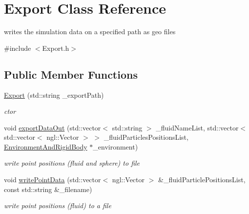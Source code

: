 \hypertarget{class_export}{
\section{Export Class Reference}
\label{class_export}
}


writes the simulation data on a specified path as geo files  




{\ttfamily \#include $<$Export.h$>$}

\subsection*{Public Member Functions}
\begin{DoxyCompactItemize}
\item 
\hyperlink{class_export_a4d7d6897c99839d1bc1571c51018bec8}{Export} (std::string \_\-exportPath)
\begin{DoxyCompactList}\small\item\em ctor \item\end{DoxyCompactList}\item 
void \hyperlink{class_export_ae3981dfddf020b1da5b91e344247977b}{exportDataOut} (std::vector$<$ std::string $>$ \_\-fluidNameList, std::vector$<$ std::vector$<$ ngl::Vector $>$ $>$ \_\-fluidParticlesPositionsList, \hyperlink{class_environment_and_rigid_body}{EnvironmentAndRigidBody} $\ast$\_\-environment)
\begin{DoxyCompactList}\small\item\em write point positions (fluid and sphere) to file \item\end{DoxyCompactList}\item 
void \hyperlink{class_export_ade2f12dbd5ab27d8268aef4233b92964}{writePointData} (std::vector$<$ ngl::Vector $>$ \&\_\-fluidParticlePositionsList, const std::string \&\_\-filename)
\begin{DoxyCompactList}\small\item\em write point positions (fluid) to a file \item\end{DoxyCompactList}\end{DoxyCompactItemize}
